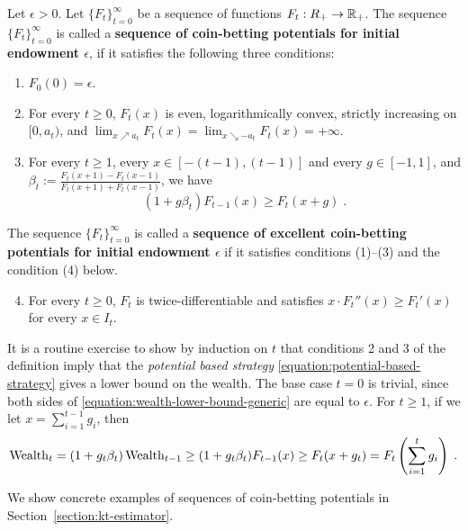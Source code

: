 \begin{definition}
\label{definition:potential}
Let $\epsilon > 0$. Let $\{F_t\}_{t=0}^\infty$ be a sequence of functions
$F_t:R_+  \to \mathbb{R}_+$.  The sequence $\{F_t\}_{t=0}^\infty$ is called a \textbf{sequence of coin-betting potentials
for initial endowment $\epsilon$}, if it satisfies the following three
conditions:
\begin{enumerate}[(1)]
\item $F_0(0) = \epsilon$.

\item For every $t \ge 0$, $F_t(x)$ is even, logarithmically convex, strictly
increasing on $[0,a_t)$, and
$\lim_{x \nearrow a_t} F_t(x) = \lim_{x \searrow -a_t} F_t(x) = +\infty$.

\item For every $t \ge 1$, every $x \in [-(t-1), (t-1)]$ and every $g \in [-1,1]$, and $\beta_t:=\tfrac{F_t(x + 1) - F_t(x - 1)}{F_t(x + 1) + F_t(x - 1)}$, we have
$$
\left(1 + g \beta_t \right) F_{t-1}(x) \ge F_t(x+g) \; .
$$
\end{enumerate}
The sequence $\{F_t\}_{t=0}^\infty$ is called a
\textbf{sequence of excellent coin-betting potentials for initial
endowment $\epsilon$} if it satisfies conditions (1)--(3) and the condition (4)
below.
\begin{enumerate}[(1)]
\setcounter{enumi}{3}
\item For every $t \ge 0$, $F_t$ is twice-differentiable and
satisfies $x \cdot F_t''(x) \ge F_t'(x)$ for every $x \in I_t$.
\end{enumerate}
\end{definition}

It is a routine exercise to show by induction on $t$ that conditions 2 and 3 of
the definition imply that the \emph{potential based strategy}
\eqref{equation:potential-based-strategy} gives a lower bound on the wealth. The base case $t=0$ is trivial,
since both sides of \eqref{equation:wealth-lower-bound-generic} are equal to
$\epsilon$. For $t \ge 1$, if we let $x = \sum_{i=1}^{t-1} g_i$, then
$$
\operatorname{Wealth}_t
= (1+g_t \beta_t) \operatorname{Wealth}_{t-1}
\ge (1 + g_t \beta_t) F_{t-1}(x)
\ge F_t(x + g_t)
= F_t \left( \sum_{i=1}^t g_i \right) \; .
$$


We show concrete examples of sequences of coin-betting potentials in
Section~\ref{section:kt-estimator}.
